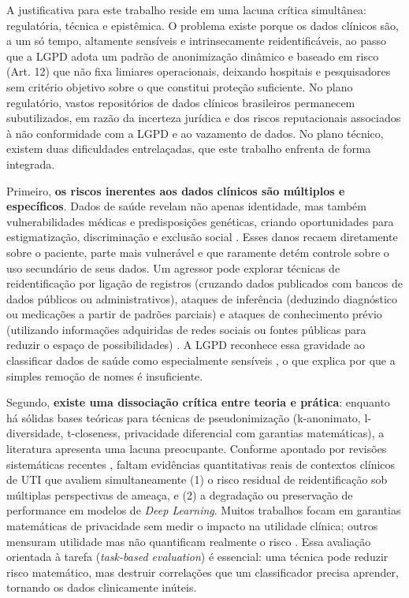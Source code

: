 A justificativa para este trabalho reside em uma lacuna crítica simultânea: regulatória, técnica e epistêmica. O problema existe porque os dados clínicos são, a um só tempo, altamente sensíveis e intrinsecamente reidentificáveis, ao passo que a LGPD adota um padrão de anonimização dinâmico e baseado em risco (Art. 12) que não fixa limiares operacionais, deixando hospitais e pesquisadores sem critério objetivo sobre o que constitui proteção suficiente. No plano regulatório, vastos repositórios de dados clínicos brasileiros permanecem subutilizados, em razão da incerteza jurídica e dos riscos reputacionais associados à não conformidade com a LGPD e ao vazamento de dados. No plano técnico, existem duas dificuldades entrelaçadas, que este trabalho enfrenta de forma integrada.

Primeiro, \textbf{os riscos inerentes aos dados clínicos são múltiplos e específicos}. Dados de saúde revelam não apenas identidade, mas também vulnerabilidades médicas e predisposições genéticas, criando oportunidades para estigmatização, discriminação e exclusão social \cite{Junior2024, Gonçalo2025}. Esses danos recaem diretamente sobre o paciente, parte mais vulnerável e que raramente detém controle sobre o uso secundário de seus dados. Um agressor pode explorar técnicas de reidentificação por ligação de registros (cruzando dados publicados com bancos de dados públicos ou administrativos), ataques de inferência (deduzindo diagnóstico ou medicações a partir de padrões parciais) e ataques de conhecimento prévio (utilizando informações adquiridas de redes sociais ou fontes públicas para reduzir o espaço de possibilidades) \cite{Olatunji2024}. A LGPD reconhece essa gravidade ao classificar dados de saúde como especialmente sensíveis \cite{Brasil2018lgpd}, o que explica por que a simples remoção de nomes é insuficiente.

Segundo, \textbf{existe uma dissociação crítica entre teoria e prática}: enquanto há sólidas bases teóricas para técnicas de pseudonimização (k-anonimato, l-diversidade, t-closeness, privacidade diferencial com garantias matemáticas), a literatura apresenta uma lacuna preocupante. Conforme apontado por revisões sistemáticas recentes \cite{SLRPrivacy2025, InocencioMartina2026}, faltam evidências quantitativas reais de contextos clínicos de UTI que avaliem simultaneamente (1) o risco residual de reidentificação sob múltiplas perspectivas de ameaça, e (2) a degradação ou preservação de performance em modelos de \textit{Deep Learning}. Muitos trabalhos focam em garantias matemáticas de privacidade sem medir o impacto na utilidade clínica; outros mensuram utilidade mas não quantificam realmente o risco \cite{SLRMapping2021}. Essa avaliação orientada à tarefa (\textit{task-based evaluation}) é essencial: uma técnica pode reduzir risco matemático, mas destruir correlações que um classificador precisa aprender, tornando os dados clinicamente inúteis.

